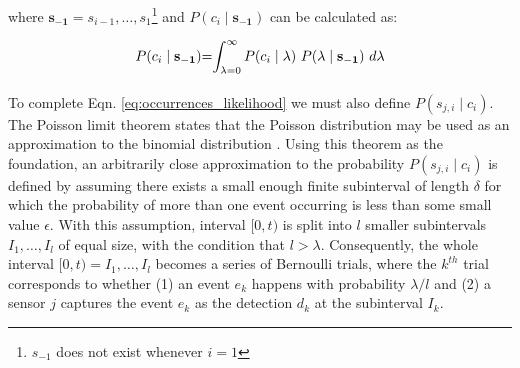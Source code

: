 \noindent where $\mathbf{s_{-1}} = s_{i-1}, \ldots, s_1$\footnote{$s_{-1}$ does not exist whenever $i = 1$} and $P(c_i \mid \mathbf{s_{-1}})$ can be calculated as:


\begin{equation}
	\label{eq:unconditional_xi}
	\begin{tabular}{r@{=}l}
		$P(c_i \mid \mathbf{s_{-1}})$ & $\displaystyle\int_{\lambda=0}^{\infty} P(c_i \mid \lambda) ~ P(\lambda \mid \mathbf{s_{-1}}) ~d\lambda$ \\ [2ex]
	\end{tabular}
\end{equation}


To complete Eqn. \ref{eq:occurrences_likelihood} we must also define $P(s_{j,i} \mid c_i)$. The Poisson limit theorem states that the Poisson distribution may be used as an approximation to the binomial distribution \cite{papoulis2002probability}. Using this theorem as the foundation, an arbitrarily close approximation to the probability $P(s_{j,i} \mid c_i)$ is defined by assuming there exists a small enough finite subinterval of length $\delta$ for which the probability of more than one event occurring is less than some small value $ \epsilon$. With this assumption, interval $[0, t)$ is split into $l$ smaller subintervals $I_1, \ldots, I_l$ of equal size, with the condition that $l > \lambda$. Consequently, the whole interval $[0, t) = I_1, \ldots, I_l$ becomes a series of Bernoulli trials, where the $k^{th}$ trial corresponds to whether (1) an event $e_k$ happens with probability $\lambda / l$ and (2) a sensor $j$ captures the event $e_k$ as the detection $d_k$ at the subinterval $I_k$.

